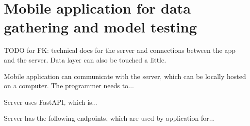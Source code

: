 
\chapter{Mobile application for data gathering and model testing}

TODO for FK: technical docs for the server and connections between the app and the server. Data layer can also be touched a little.

Mobile application can communicate with the server, which can be locally hosted on a computer. The programmer needs to...

Server uses FastAPI, which is...

Server has the following endpoints, which are used by application for...